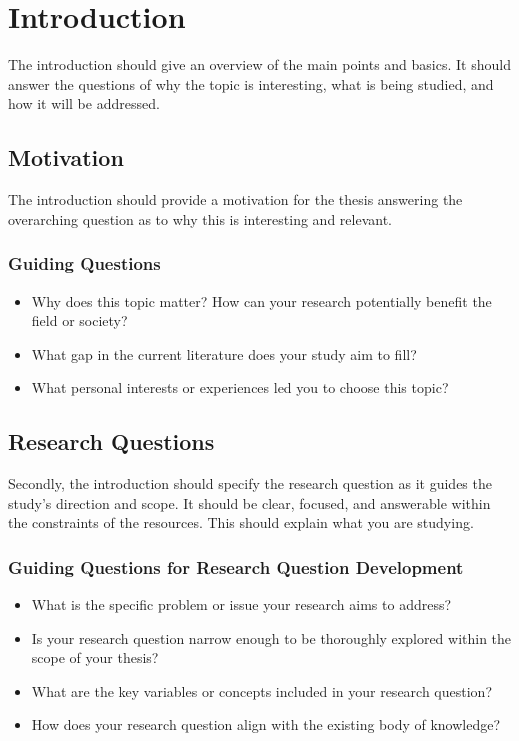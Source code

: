 \chapter{Introduction}
\label{ch:intro}

The introduction should give an overview of the main points and basics. It should answer the questions of 
why the topic is interesting, what is being studied, and how it will be addressed.

\section{Motivation}

The introduction should provide a motivation for the thesis answering the overarching question as to why this is interesting and relevant.

\subsection*{Guiding Questions}
\begin{itemize}
    \item Why does this topic matter? How can your research potentially benefit the field or society?
    \item What gap in the current literature does your study aim to fill?
    \item What personal interests or experiences led you to choose this topic?
\end{itemize}

\section{Research Questions}
Secondly, the introduction should specify the research question as it guides the study's direction and scope. It should be clear, focused, and answerable within the constraints of the resources. This should explain what you are studying. 

\subsection*{Guiding Questions for Research Question Development}
\begin{itemize}
    \item What is the specific problem or issue your research aims to address?
    \item Is your research question narrow enough to be thoroughly explored within the scope of your thesis?
    \item What are the key variables or concepts included in your research question?
    \item How does your research question align with the existing body of knowledge?
\end{itemize}

